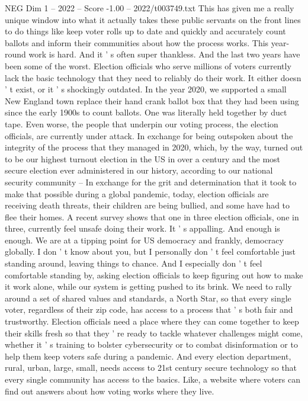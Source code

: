 \begin{textsample}{NEG Dim 1 – 2022 – Score -1.00 – 2022/t003749.txt}
This has given me a really unique window into what it actually takes these public servants on the front lines to do things like keep voter rolls up to date and quickly and accurately count ballots and inform their communities about how the process works.
This year-round work is hard.
And it ' s often super thankless.
And the last two years have been some of the worst.
Election officials who serve millions of voters currently lack the basic technology that they need to reliably do their work.
It either doesn ' t exist, or it ' s shockingly outdated.
In the year 2020, we supported a small New England town replace their hand crank ballot box that they had been using since the early 1900s to count ballots.
One was literally held together by duct tape.
Even worse, the people that underpin our voting process, the election officials, are currently under attack.
In exchange for being outspoken about the integrity of the process that they managed in 2020, which, by the way, turned out to be our highest turnout election in the US in over a century and the most secure election ever administered in our history, according to our national security community -- In exchange for the grit and determination that it took to make that possible during a global pandemic, today, election officials are receiving death threats, their children are being bullied, and some have had to flee their homes.
A recent survey shows that one in three election officials, one in three, currently feel unsafe doing their work.
It ' s appalling.
And enough is enough.
We are at a tipping point for US democracy and frankly, democracy globally.
I don ' t know about you, but I personally don ' t feel comfortable just standing around, leaving things to chance.
And I especially don ' t feel comfortable standing by, asking election officials to keep figuring out how to make it work alone, while our system is getting pushed to its brink.
We need to rally around a set of shared values and standards, a North Star, so that every single voter, regardless of their zip code, has access to a process that ' s both fair and trustworthy.
Election officials need a place where they can come together to keep their skills fresh so that they ' re ready to tackle whatever challenges might come, whether it ' s training to bolster cybersecurity or to combat disinformation or to help them keep voters safe during a pandemic.
And every election department, rural, urban, large, small, needs access to 21st century secure technology so that every single community has access to the basics.
Like, a website where voters can find out answers about how voting works where they live.

\end{textsample}

